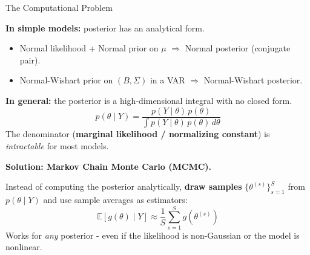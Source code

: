 \documentclass{beamer}
\begin{document}
\begin{frame}{The Computational Problem}
\footnotesize

\textbf{In simple models:} posterior has an analytical form.
\begin{itemize}
  \item Normal likelihood + Normal prior on $\mu$ $\Rightarrow$ Normal posterior (conjugate pair).
  \item Normal-Wishart prior on $(B, \Sigma)$ in a VAR $\Rightarrow$ Normal-Wishart posterior.
\end{itemize}

\medskip
\textbf{In general:} the posterior is a high-dimensional integral with no closed form.
\[
p(\theta \mid Y) = \frac{p(Y \mid \theta)\, p(\theta)}{\int p(Y \mid \theta)\, p(\theta)\, d\theta}
\]
The denominator (\textbf{marginal likelihood / normalizing constant}) is \emph{intractable} for most models.

\pause
\medskip
\textbf{Solution: Markov Chain Monte Carlo (MCMC).}

Instead of computing the posterior analytically, \textbf{draw samples} $\{\theta^{(s)}\}_{s=1}^S$ from
$p(\theta \mid Y)$ and use sample averages as estimators:
\[
\mathbb{E}[g(\theta) \mid Y] \approx \frac{1}{S}\sum_{s=1}^S g(\theta^{(s)})
\]
Works for \emph{any} posterior - even if the likelihood is non-Gaussian or the model is nonlinear.

\end{frame}
\end{document}
